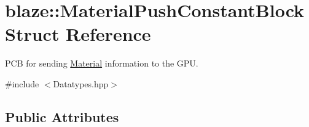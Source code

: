 \hypertarget{structblaze_1_1MaterialPushConstantBlock}{}\section{blaze\+:\+:Material\+Push\+Constant\+Block Struct Reference}
\label{structblaze_1_1MaterialPushConstantBlock}


P\+CB for sending \hyperlink{classblaze_1_1Material}{Material} information to the G\+PU.  




{\ttfamily \#include $<$Datatypes.\+hpp$>$}

\subsection*{Public Attributes}
